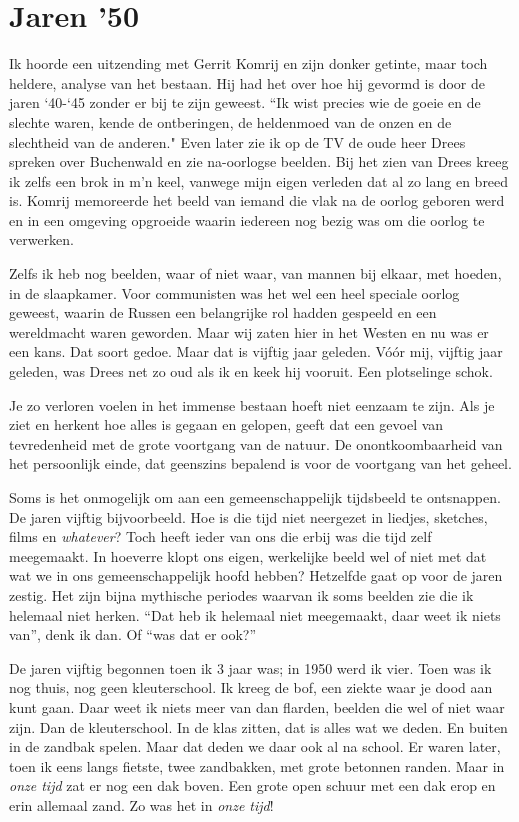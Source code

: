 \documentclass[12pt,twoside, openright]{memoir}
\begin{document}
\chapter{Jaren '50} %
\label{cha:jaren50}

Ik hoorde een uitzending met Gerrit Komrij en zijn donker getinte, maar toch heldere, analyse van het bestaan. Hij had het over hoe hij gevormd is door de jaren `40-`45 zonder er bij te zijn geweest. ``Ik wist precies wie de goeie en de slechte waren, kende de ontberingen, de heldenmoed van de onzen en de slechtheid van de anderen." Even later zie ik op de TV de oude heer Drees spreken over Buchenwald en zie na-oorlogse beelden. Bij het zien van Drees kreeg ik zelfs een brok in m’n keel, vanwege mijn eigen verleden dat al zo lang en breed is. Komrij memoreerde het beeld van iemand die vlak na de oorlog geboren werd en in een omgeving opgroeide waarin iedereen nog bezig was om die oorlog te verwerken. 

Zelfs ik heb nog beelden, waar of niet waar, van mannen bij elkaar, met hoeden, in de slaapkamer. Voor communisten was het wel een heel speciale oorlog geweest, waarin de Russen een belangrijke rol hadden gespeeld en een wereldmacht waren geworden. Maar wij zaten hier in het Westen en nu was er een kans. Dat soort gedoe. Maar dat is vijftig jaar geleden. Vóór mij, vijftig jaar geleden, was Drees net zo oud als ik en keek hij vooruit. Een plotselinge schok.

Je zo verloren voelen in het immense bestaan hoeft niet eenzaam te zijn. Als je ziet en herkent hoe alles is gegaan en gelopen, geeft dat een gevoel van tevredenheid met de grote voortgang van de natuur. De onontkoombaarheid van het persoonlijk einde, dat geenszins bepalend is voor de voortgang van het geheel.

Soms is het onmogelijk om aan een gemeenschappelijk tijdsbeeld te ontsnappen. De jaren vijftig bijvoorbeeld. Hoe is die tijd niet neergezet in liedjes, sketches, films en \emph{whatever}? Toch heeft ieder van ons die erbij was die tijd zelf meegemaakt. In hoeverre klopt ons eigen, werkelijke beeld wel of niet met dat wat we in ons gemeenschappelijk hoofd hebben? Hetzelfde gaat op voor de jaren zestig. Het zijn bijna mythische periodes waarvan ik soms beelden zie die ik helemaal niet herken. ``Dat heb ik helemaal niet meegemaakt, daar weet ik niets van'', denk ik dan. Of ``was dat er ook?''

De jaren vijftig begonnen toen ik 3 jaar was; in 1950 werd ik vier. Toen was ik nog thuis, nog geen kleuterschool. Ik kreeg de bof, een ziekte waar je dood aan kunt gaan. Daar weet ik niets meer van dan flarden, beelden die wel of niet waar zijn. Dan de kleuterschool. In de klas zitten, dat is alles wat we deden. En buiten in de zandbak spelen. Maar dat deden we daar ook al na school. Er waren later, toen ik eens langs fietste, twee zandbakken, met grote betonnen randen. Maar in \emph{onze tijd} zat er nog een dak boven. Een grote open schuur met een dak erop en erin allemaal zand. Zo was het in \emph{onze tijd}!
\end{document}
